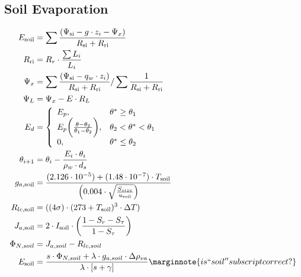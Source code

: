 \documentclass[24pt]{report}
\begin{document}

\subsection*{Soil Evaporation}

\begin{align}
 E_{\text{soil}} &= \sum \frac{(\Psi_{\text{si}} - g \cdot z_i - \Psi_x)}{R_{\text{si}}+R_{\text{ri}}} \label{eqn:Esoil} \\
 R_{\text{ri}} &= R_{r} \cdot \frac{\sum L_i}{L_i} \label{eqn:Rri} \\
 \Psi_x &= \sum \frac{(\Psi_{\text{si}}-q_w \cdot z_i)}{R_{\text{si}}+R_{\text{ri}}} / \sum \frac{1}{R_{\text{si}}+R_{\text{ri}}} \label{eqn:Psix} \\
 \Psi_L &= \Psi_x  - E \cdot R_L \hspace{3.2in} \label{eqn:PsiL}\\
 E_d &= \left\{ \begin{array}{ll}
        E_p , & \theta^{*} \geq \theta_1 \\
        E_p\biggl( \frac{\theta-\theta_2}{\theta_1 - \theta_2} \biggr), & \theta_2<\theta^*<\theta_1 \\
         0, & \theta^{*} \leq \theta_2 
                \end{array} \right. \label{eqn:Ed}\\
 \theta_{i+1} &= \theta_i - \frac{E_i \cdot \theta_i}{\rho_w \cdot d_s} \label{eqn:theta}\\
 g_{a,\text{soil}} &= \frac{(2.126 \cdot 10^{-5})+(1.48 \cdot 10^{-7}) \cdot T_{\text{soil}}}{\left(0.004 \cdot \sqrt{\frac{S_{size}}{u_{\text{soil}}}} \right)} \label{eqn:gasoil} \\
 R_{lc,\text{soil}} &= ((4 \sigma)\cdot(273 + T_{\text{soil}})^3 \cdot \Delta T) \label{eqn:Rlcsoil} \\
 J_{a,\text{soil}} &= 2 \cdot I_{\text{soil}} \cdot \biggl(\frac{1-S_r-S_{\tau}}{1-S_{\tau}}\biggr) \label{eqn:Jasoil} \\
 \Phi_{N,soil} &= J_{a,soil} - R_{lc,soil} \label{eqn:PhiNsoil} \\
 E_\text{soil} &= \frac{s \cdot \Phi_{N,soil} + \lambda \cdot g_{a,soil} \cdot \Delta \rho_{va}}{\lambda \cdot [s+\gamma]} \label{eqn:E2} \marginnote{is ``soil'' subscript correct?}
\end{align}
\end{document}
